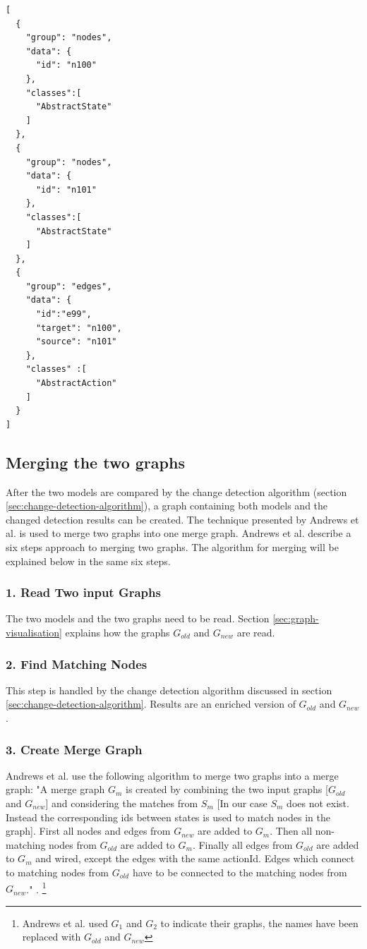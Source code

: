 \newpage
\begin{lstlisting}[language=xml, caption=Graph representation in JSON, label=code:graph-json]
[
  {
    "group": "nodes",
    "data": {
      "id": "n100" 
    },
    "classes":[
      "AbstractState"
    ]
  },
  {
    "group": "nodes",
    "data": {
      "id": "n101"
    },
    "classes":[
      "AbstractState"
    ]
  },
  {
    "group": "edges",
    "data": {
      "id":"e99",
      "target": "n100",
      "source": "n101"
    },
    "classes" :[
      "AbstractAction"
    ]
  }
]
\end{lstlisting}

\subsection{Merging the two graphs} \label{sec:merge-graph}

After the two models are compared by the change detection algorithm (section \ref{sec:change-detection-algorithm}), a graph containing both models and the changed detection results can be created. The technique presented by Andrews et al. \cite{andrews2009visual} is used to merge two graphs into one merge graph. Andrews et al. describe a six steps approach to merging two graphs. The algorithm for merging will be explained below in the same six steps.

\subsubsection{1. Read Two input Graphs}

The two models and the two graphs need to be read. Section \ref{sec:graph-visualisation} explains how the graphs $G_{old}$ and $G_{new}$ are read.

\subsubsection{2. Find Matching Nodes}
This step is handled by the change detection algorithm discussed in section \ref{sec:change-detection-algorithm}.
Results are an enriched version of $G_{old}$ and $G_{new}$. 


\subsubsection{3. Create Merge Graph}
Andrews et al. use the following algorithm to merge two graphs into a merge graph: "A merge graph $G_m$ is created by combining the two input graphs [$G_{old}$ and $G_{new}$] and considering the matches from $S_m$ [In our case $S_m$ does not exist. Instead the corresponding ids between states is used to match nodes in the graph]. First all nodes and edges from $G_{new}$ are added to $G_m$. Then all non-matching nodes from $G_{old}$ are added to $G_m$. Finally all edges from $G_{old}$ are added to $G_m$ and wired, except the edges with the same actionId. Edges which connect to matching nodes from $G_{old}$ have to be connected to the matching nodes from $G_{new}$." \cite{andrews2009visual}. \footnote{Andrews et al. used $G_1$ and $G_2$ to indicate their graphs, the names have been replaced with $G_{old}$ and $G_{new}$}

